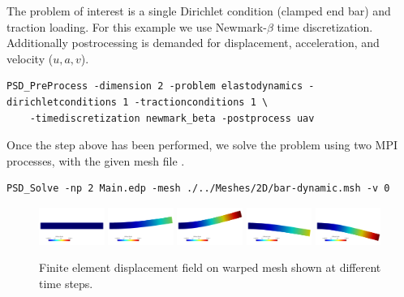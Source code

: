 The problem of interest is a single Dirichlet condition (clamped end bar) and traction loading. For this example we use Newmark-$\beta$ time discretization. Additionally postrocessing is demanded for displacement, acceleration, and velocity ($u,a,v$). 

\begin{lstlisting}[style=BashInputStyle]
	PSD_PreProcess -dimension 2 -problem elastodynamics -dirichletconditions 1 -tractionconditions 1 \
	-timediscretization newmark_beta -postprocess uav
\end{lstlisting}

Once the step above has been performed, we solve the problem using two MPI processes, with the given mesh file . 

\begin{lstlisting}[style=BashInputStyle]
	PSD_Solve -np 2 Main.edp -mesh ./../Meshes/2D/bar-dynamic.msh -v 0
\end{lstlisting}

\begin{figure}[h!]
	\includegraphics[width=0.19\textwidth]{./Images/ed-u0.png}
	\includegraphics[width=0.19\textwidth]{./Images/ed-u2.png}
	\includegraphics[width=0.19\textwidth]{./Images/ed-u3.png}
	\includegraphics[width=0.19\textwidth]{./Images/ed-u4.png}
	\includegraphics[width=0.19\textwidth]{./Images/ed-u5.png}
	\caption{Finite element displacement field on warped mesh shown at different time steps. \label{bar-ed}}
\end{figure}

